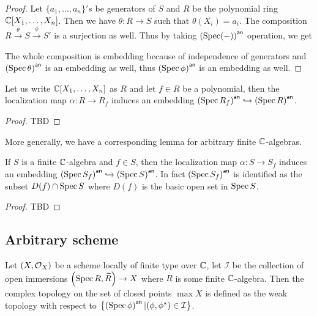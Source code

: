 \begin{proof}
  Let $\{a_{1},\dots, a_{n}\}'s$ be generators of $S$ and $R$ be the polynomial ring $\mathbb{C}[X_{1},\dots, X_{n}]$. Then we have $\theta : R \to S$ such that $\theta(X_{i})=a_{i}$. The composition $R \stackrel{\theta}{\to} S \stackrel{\phi}{\to} S'$ is a surjection as well. Thus by taking $\left({\operatorname{Spec}(-)}\right)^{\mathsf{an}}$ operation, we get
  \begin{center}
  \end{center}
  The whole composition is embedding because of independence of generators and $\left({\operatorname{Spec}{\theta}}\right)^{\mathsf{an}}$ is an embedding as well, thus $\left({\operatorname{Spec}{\phi}}\right)^{\mathsf{an}}$ is an embedding as well.
\end{proof}

\begin{lemma}
  Let us write $\mathbb{C}[X_{1},\dots,X_{n}]$ as $R$ and let $f \in R$ be a polynomial, then the localization map $\alpha : R \to R_{f}$ induces an embedding $\left({\operatorname{Spec}{R_{f}}}\right)^{\mathsf{an}} \hookrightarrow \left({\operatorname{Spec}{R}}\right)^{\mathsf{an}}$.
\end{lemma}
\begin{proof}
TBD
\end{proof}

More generally, we have a corresponding lemma for arbitrary finite $\mathbb{C}$-algebras.

\begin{lemma}
  If $S$ is a finite $\mathbb{C}$-algebra and $f \in S$, then the localization map $\alpha : S \to S_{f}$ induces an embedding $\left({\operatorname{Spec}{S_{f}}}\right)^{\mathsf{an}} \hookrightarrow \left({\operatorname{Spec}{S}}\right)^{\mathsf{an}}$. In fact $\left({\operatorname{Spec}{S_{f}}}\right)^{\mathsf{an}}$ is identified as the subset $D(f) \cap \operatorname{Spec}{S}$ where $D(f)$ is the basic open set in $\operatorname{Spec}{S}$.
\end{lemma}

\begin{proof}
TBD
\end{proof}

\subsection{Arbitrary scheme}

\begin{definition}
 Let $\left(X, \mathcal{O}_{X}\right)$ be a scheme locally of finite type over $\mathbb{C}$, let $\mathcal{I}$ be the collection of open immersions $\left(\operatorname*{Spec}{R}, \widetilde{R}\right) \to X$ where $R$ is some finite $\mathbb{C}$-algebra. Then the complex topology on the set of closed points $\max X$ is defined as the weak topology with respect to $\left\{\left({\operatorname{Spec}{\phi}}\right)^{\mathsf{an}} | (\phi, \phi^{*}) \in \mathcal{I}\right\}$.
\end{definition}
